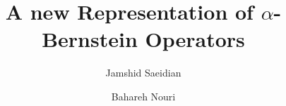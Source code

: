 \documentclass[preprint,12pt]{elsarticle}
\theoremstyle{definition}
\theoremstyle{theorem}
\theoremstyle{lemma}
\theoremstyle{example}
\theoremstyle{remark}
\theoremstyle{prop}
\begin{document}
\begin{frontmatter}



\title{A new Representation of $\alpha$-Bernstein Operators }


\author{Jamshid  Saeidian }
\author{ Bahareh Nouri} 


%  
 \address{Faculty of Mathematical Sciences and Computer, Kharazmi University, No. 50,  Taleghani ave., Tehran, Iran.}

%

\begin{abstract}


\end{abstract}
\end{frontmatter}
\end{document}
